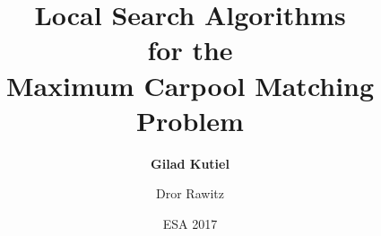 \title{
Local Search Algorithms 
\\
for the 
\\
Maximum Carpool Matching Problem
}
\author[shortname]{
    \textbf{Gilad Kutiel}  \and Dror Rawitz 
}
\date{ESA 2017}

